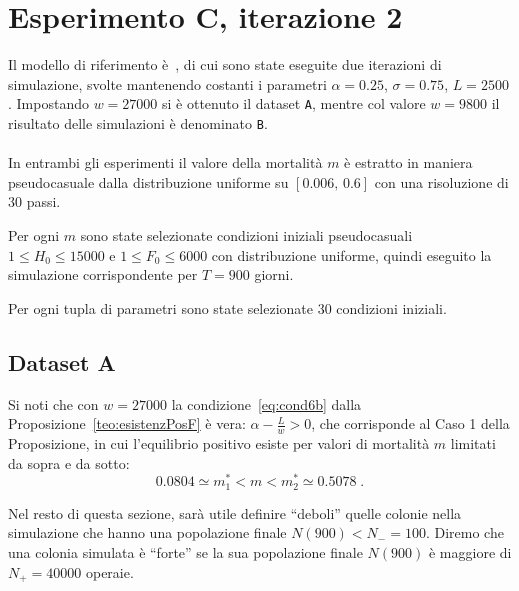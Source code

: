 \section{Esperimento C, iterazione 2}
Il modello di riferimento è~\cite{khoury2011}, di cui sono state eseguite
due iterazioni di simulazione, svolte mantenendo costanti i parametri $\alpha = 0.25$, $\sigma=0.75$,
$L=2500$.
Impostando $w=27000$ si è ottenuto il dataset \texttt{A}, mentre col valore
$w=9800$ il risultato delle simulazioni è denominato \texttt{B}.

\paragraph{}
In entrambi gli esperimenti il valore della mortalità $m$ è estratto in maniera pseudocasuale dalla distribuzione
uniforme su $[0.006, \, 0.6]$
con una risoluzione di 30 passi.

Per ogni $m$ sono state selezionate condizioni iniziali pseudocasuali $1 \leq H_0 \leq 15000$ e
$1 \leq F_0 \leq 6000$ con distribuzione uniforme, quindi eseguito la simulazione corrispondente per $T=900$ giorni.

Per ogni tupla di parametri sono state selezionate 30 condizioni iniziali.

\subsection{Dataset A}
\label{sec:kh11expC2A}
Si noti che con $w=27000$ la condizione~\eqref{eq:cond6b} dalla Proposizione~\ref{teo:esistenzPosF} è vera:
$\alpha - \frac{L}{w} > 0$, che corrisponde al Caso 1 della Proposizione,
in cui l'equilibrio positivo esiste per valori di mortalità $m$ limitati da sopra e da sotto:
$$ 0.0804 \simeq m_1^* < m < m_2^* \simeq 0.5078 \; .$$

Nel resto di questa sezione, sarà utile definire ``deboli'' quelle colonie nella simulazione che hanno
una popolazione finale $N(900) < N_- = 100$.
Diremo che una colonia simulata è ``forte'' se la sua popolazione finale $N(900)$
è maggiore di $N_+ = 40000$ operaie.

